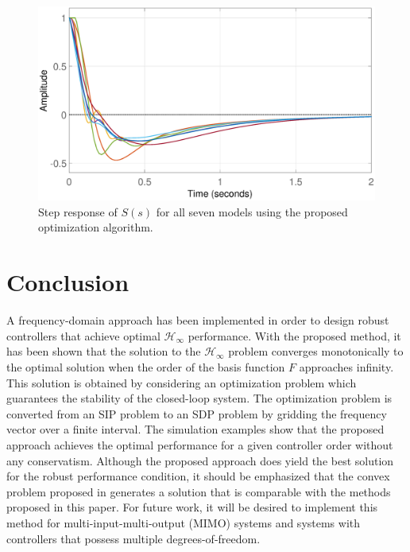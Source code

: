 \documentclass[letterpaper, 10 pt, conference]{ieeeconf}  %
\begin{document}
\begin{figure}
\centering
\includegraphics[width=\columnwidth]{../pics/step_multi_optimal.eps}
\caption{Step response of $S(s)$ for all seven models using the proposed optimization algorithm.}
\label{fig:ex3_2}
\end{figure}


\section{Conclusion} \label{sec:conclusion}
A frequency-domain approach has been implemented in order to design robust controllers that achieve optimal $\mathcal{H}_{\infty}$ performance. With the proposed method, it has been shown that the solution to the $\mathcal{H}_{\infty}$ problem converges monotonically to the optimal solution when the order of the basis function $F$ approaches infinity. This solution is obtained by considering an optimization problem which guarantees the stability of the closed-loop system. The optimization problem is converted from an SIP problem to an SDP problem by gridding the frequency vector over a finite interval. The simulation examples show that the proposed approach achieves the optimal performance for a given controller order without any conservatism. Although the proposed approach does yield the best solution for the robust performance condition, it should be emphasized that the convex problem proposed in \cite{KNZ16} generates a solution that is comparable with the methods proposed in this paper. For future work, it will be desired to implement this method for multi-input-multi-output (MIMO) systems and systems with controllers that possess multiple degrees-of-freedom.  


\end{document}
